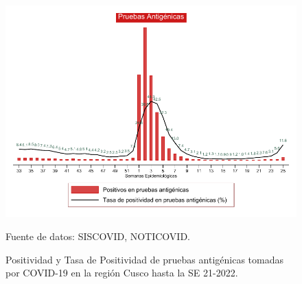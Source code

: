 \documentclass[12pt,a4paper,openany]{book}
\begin{document}
	\begin{landscape}
		
		\begin{figure}[h]
			\caption{ Positividad y Tasa de Positividad de pruebas antigénicas tomadas por COVID-19 en la región Cusco hasta la SE 21-2022.}\label{fig:positividad_ag}
			\begin{center}
				\includegraphics[width=0.90\linewidth]{../figuras/positividad_ag.pdf}
			\end{center}
			{\footnotesize {Fuente de datos: SISCOVID, NOTICOVID.}}
		\end{figure}
	\end{landscape}
\end{document}
